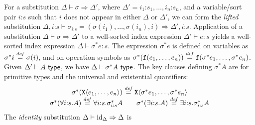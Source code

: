 For a substitution $\Delta \vdash \sigma \Rightarrow
\Delta'$, where $\Delta' = i_1\mathord:s_1,\ldots,i_n\mathord:s_n$, and a
variable/sort pair $i\mathord:s$ such that $i$ does not appear in
either $\Delta$ or $\Delta'$, we can form the \emph{lifted}
substitution $\Delta,i\mathord:s \vdash
\sigma_{i\mathord:s} = (\sigma(i_1), \ldots, \sigma(i_n), i) \Rightarrow
\Delta',i\mathord:s$. %
%
Application of a substitution $\Delta \vdash \sigma
\Rightarrow \Delta'$ to a well-sorted index expression $\Delta' \vdash
e : s$ yields a well-sorted index expression $\Delta \vdash \sigma^*e
: s$. The expression $\sigma^*e$ is defined on variables as $\sigma^*i
\stackrel{\mathit{def}}= \sigma(i)$, and on operation symbols as
$\sigma^*(\textup{\texttt{f}}(e_1,\ldots,e_n)) \stackrel{\mathit{def}}=
\textup{\texttt{f}}(\sigma^*e_1, \ldots, \sigma^*e_n)$.  %
Given
$\Delta' \vdash A \textup{\textsf{ type}}$, 
we have $\Delta \vdash \sigma^*A
\textup{\textsf{ type}}$. The key clauses defining $\sigma^*A$ are for primitive types
and the universal and existential quantifiers:
\begin{displaymath}
  \begin{array}{c}
    \sigma^*(\tyPrim{X}{e_1,\ldots,e_n}) \isDefinedAs \tyPrim{X}{\sigma^*e_1,\ldots,\sigma^*e_n}
    \\
    \begin{array}{c@{\hspace{2em}}c}
      \sigma^*(\forall i\mathord:s.A) \isDefinedAs \forall i\mathord:s.\sigma_{i\mathord:s}^*A
      &
      \sigma^*(\exists i\mathord:s.A) \isDefinedAs \exists i\mathord:s. \sigma_{i\mathord:s}^*A
    \end{array}
  \end{array}
\end{displaymath}
The \emph{identity} substitution $\Delta \vdash
\mathrm{id}_\Delta \Rightarrow \Delta$ is %
